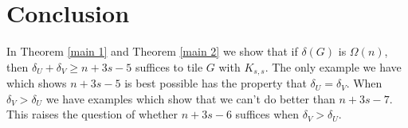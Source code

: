\documentclass[oneside,12pt]{memoir}
\newtheorem{fact}[theorem]{Fact}
\newcommand{\floor}[1]{\left\lfloor#1\right\rfloor}
\newcommand{\croot}[1]{\left\lceil\sqrt{#1}\right\rceil}
\begin{document}
% 
% 
% 
% 
% 
% 
% 

\section{Conclusion}

In Theorem \ref{main 1} and Theorem \ref{main 2} we show that if $\delta(G)$ is $\Omega(n)$, then $\delta_U+\delta_V\geq n+3s-5$ suffices to tile $G$ with $K_{s,s}$.  The only example we have which shows $n+3s-5$ is best possible has the property that $\delta_U=\delta_V$.  When $\delta_V>\delta_U$ we have examples which show that we can't do better than $n+3s-7$.  This raises the question of whether $n+3s-6$ suffices when $\delta_V>\delta_U$.
\end{document}
